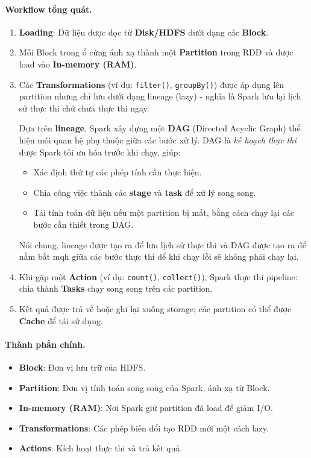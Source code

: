 \documentclass[11pt]{article}
\begin{document}
\paragraph{Workflow tổng quát.}
\begin{enumerate}
    \item \textbf{Loading}: Dữ liệu được đọc từ \textbf{Disk/HDFS} dưới dạng các \textbf{Block}.
    \item Mỗi Block trong ổ cứng ánh xạ thành một \textbf{Partition} trong RDD và được load vào \textbf{In-memory (RAM)}.
    \item Các \textbf{Transformations} (ví dụ: \texttt{filter()}, \texttt{groupBy()}) được áp dụng lên partition nhưng chỉ lưu dưới dạng lineage (lazy) - nghĩa là Spark lưu lại lịch sử thực thi chứ chưa thực thi ngay.

    \medskip
    Dựa trên \textbf{lineage}, Spark xây dựng một \textbf{DAG} (Directed Acyclic Graph) thể hiện mối quan hệ phụ thuộc giữa các bước xử lý. DAG là \textit{kế hoạch thực thi} được Spark tối ưu hóa trước khi chạy, giúp:
    \begin{itemize}
        \item Xác định thứ tự các phép tính cần thực hiện.
        \item Chia công việc thành các \textbf{stage} và \textbf{task} để xử lý song song.
        \item Tái tính toán dữ liệu nếu một partition bị mất, bằng cách chạy lại các bước cần thiết trong DAG.
    \end{itemize}

    \textrightarrow \space Nói chung, lineage được tạo ra để lưu lịch sử thực thi và DAG được tạo ra để nắm bắt mqh giữa các bước thực thi dể khi chạy lỗi sẽ không phải chạy lại.

    \item Khi gặp một \textbf{Action} (ví dụ: \texttt{count()}, \texttt{collect()}), Spark thực thi pipeline: chia thành \textbf{Tasks} chạy song song trên các partition.
    \item Kết quả được trả về hoặc ghi lại xuống storage; các partition có thể được \textbf{Cache} để tái sử dụng.
\end{enumerate}

\paragraph{Thành phần chính.}
\begin{itemize}
    \item \textbf{Block}: Đơn vị lưu trữ của HDFS.
    \item \textbf{Partition}: Đơn vị tính toán song song của Spark, ánh xạ từ Block.
    \item \textbf{In-memory (RAM)}: Nơi Spark giữ partition đã load để giảm I/O.
    \item \textbf{Transformations}: Các phép biến đổi tạo RDD mới một cách lazy.
    \item \textbf{Actions}: Kích hoạt thực thi và trả kết quả.
\end{itemize}
\end{document}
